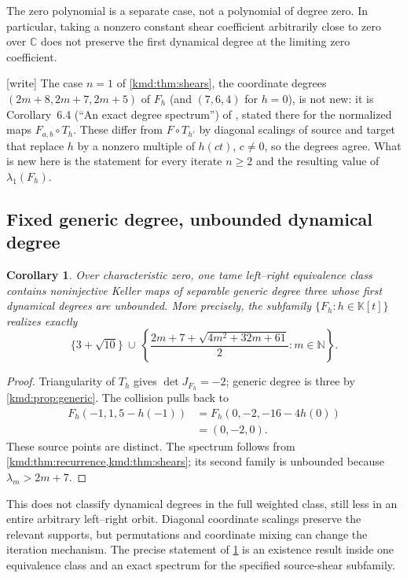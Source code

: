\documentclass[11pt,a4paper]{article}
\numberwithin{equation}{section}
\newtheorem{corollary}[theorem]{Corollary}
\theoremstyle{definition}
\theoremstyle{remark}
\newcommand{\K}{\mathbb K}
\newcommand{\C}{\mathbb C}
\newcommand{\N}{\mathbb N}
\newcommand{\wtag}{\textup{[write]}}%
\begin{document}
The zero polynomial is a separate case, not a polynomial of degree
zero. In particular, taking a nonzero constant shear coefficient
arbitrarily close to zero over $\C$ does not preserve the first
dynamical degree at the limiting zero coefficient.

\noindent\wtag{} The case $n=1$ of \cref{kmd:thm:shears}, the coordinate
degrees $(2m+8,2m+7,2m+5)$ of $F_h$ (and $(7,6,4)$ for $h=0$), is not
new: it is Corollary~6.4 (``An exact degree spectrum'') of
\cite{weighted}, stated there for the normalized maps $F_{a,b}\circ T_h$.
These differ from $F\circ T_{h'}$ by diagonal scalings of source and
target that replace $h$ by a nonzero multiple of $h(ct)$, $c\ne0$, so
the degrees agree. What is new here is the statement for every
iterate $n\ge2$ and the resulting value of $\lambda_1(F_h)$.

\subsection{Fixed generic degree, unbounded dynamical degree}
\begin{corollary}\label{kmd:cor:unbounded}
Over characteristic zero, one tame left--right equivalence class
contains noninjective Keller maps of separable generic degree three
whose first dynamical degrees are unbounded. More precisely, the
subfamily $\{F_h:h\in\K[t]\}$ realizes exactly
\begin{equation}
 \{3+\sqrt{10}\}\ \cup\
 \left\{\frac{2m+7+\sqrt{4m^2+32m+61}}2:m\in\N\right\}.
 \label{kmd:eq:spectrum}
\end{equation}
\end{corollary}
\begin{proof}
Triangularity of $T_h$ gives $\det J_{F_h}=-2$; generic degree is
three by \cref{kmd:prop:generic}. The collision pulls back to
\begin{align*}
 F_h(-1,1,5-h(-1))
 &=F_h(0,-2,-16-4h(0))\\
 &=(0,-2,0).
\end{align*}
These source points are distinct. The spectrum follows from
\cref{kmd:thm:recurrence,kmd:thm:shears}; its second family is unbounded
because $\lambda_m>2m+7$.
\end{proof}

This does not classify dynamical degrees in the full weighted class,
still less in an entire arbitrary left--right orbit. Diagonal
coordinate scalings preserve the relevant supports, but permutations
and coordinate mixing can change the iteration mechanism. The
precise statement of \cref{kmd:cor:unbounded} is an existence result
inside one equivalence class and an exact spectrum for the specified
source-shear subfamily.
\end{document}
